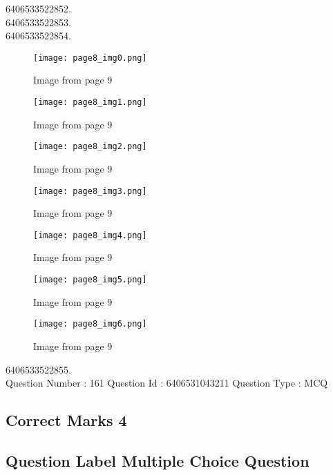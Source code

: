 \documentclass{article}
\begin{document}
6406533522852.\\

6406533522853.\\

6406533522854.\\

\newpage
\begin{figure}[h]
\centering
\texttt{[image: page8\_img0.png]}
\caption{Image from page 9}
\end{figure}

\begin{figure}[h]
\centering
\texttt{[image: page8\_img1.png]}
\caption{Image from page 9}
\end{figure}

\begin{figure}[h]
\centering
\texttt{[image: page8\_img2.png]}
\caption{Image from page 9}
\end{figure}

\begin{figure}[h]
\centering
\texttt{[image: page8\_img3.png]}
\caption{Image from page 9}
\end{figure}

\begin{figure}[h]
\centering
\texttt{[image: page8\_img4.png]}
\caption{Image from page 9}
\end{figure}

\begin{figure}[h]
\centering
\texttt{[image: page8\_img5.png]}
\caption{Image from page 9}
\end{figure}

\begin{figure}[h]
\centering
\texttt{[image: page8\_img6.png]}
\caption{Image from page 9}
\end{figure}

6406533522855.\\

Question Number : 161 Question Id : 6406531043211 Question Type : MCQ\\

\subsection{Correct Marks  4}

\subsection{Question Label  Multiple Choice Question}
\end{document}
